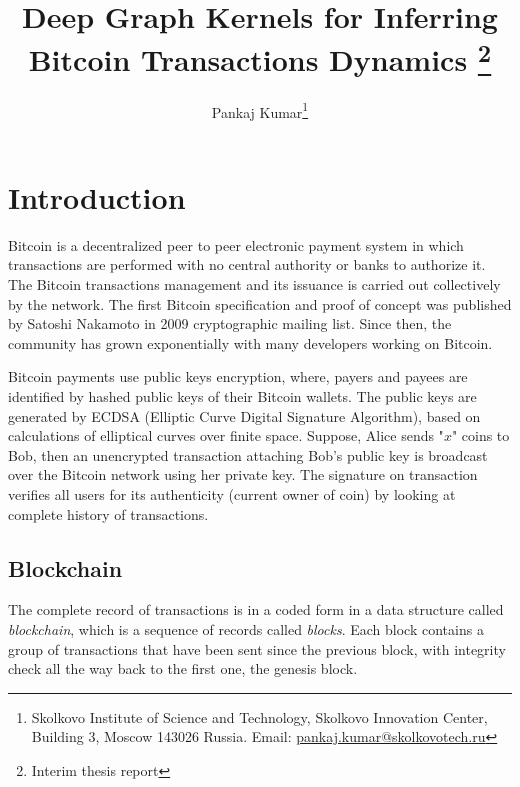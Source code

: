 \documentclass[12pt,a4paper]{article}
\title{Deep Graph Kernels for Inferring Bitcoin Transactions Dynamics \thanks{Interim thesis report} }
\author{Pankaj Kumar\thanks{Skolkovo Institute of Science and Technology, Skolkovo Innovation Center, Building 3, Moscow  143026 Russia. Email: \url{pankaj.kumar@skolkovotech.ru}}}
\date{}
\numberwithin{equation}{section}
\numberwithin{figure}{section}
\numberwithin{table}{section}
\begin{document}
\maketitle
%
\newpage
\section{Introduction}
\label{sec:Introduction}
Bitcoin is a decentralized peer to peer electronic payment system in which transactions are performed with no central authority or banks to authorize it. The Bitcoin transactions management and its issuance is carried out collectively by the network. The first Bitcoin specification and proof of concept was published by Satoshi Nakamoto \citep{Nakamoto2009} in 2009 cryptographic mailing list. Since then, the community has grown exponentially with many developers working on Bitcoin.

Bitcoin payments use public keys encryption, where, payers and payees are identified by hashed public keys of their Bitcoin wallets. The public keys are generated by ECDSA (Elliptic Curve Digital Signature Algorithm), based on calculations of elliptical curves over finite space. Suppose, Alice sends "$x$" coins to Bob, then an unencrypted transaction attaching Bob's public key is broadcast over the Bitcoin network using her private key. The signature on transaction verifies all users for its authenticity (current owner of coin) by looking at complete history of transactions.



\subsection{Blockchain}
\label{subsec:Blockchain}

The complete record of transactions is in a coded form in a data structure called {\it blockchain}, which is a sequence of records called {\it blocks}. Each block contains a group of transactions that have been sent since the previous block, with integrity check all the way back to the first one, the genesis block.
\end{document}
